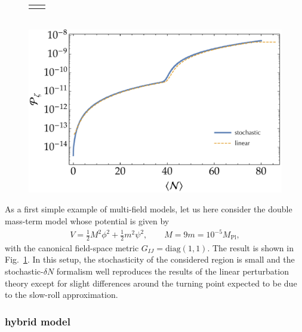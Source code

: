 \documentclass[aps, prd
, preprint
, nofootinbib 
, longbibliography
]{revtex4-1}
\newcommand{\diag}{\mathrm{diag}}
\newcommand{\Mpl}{M_\text{Pl}}
\newcommand{\bae}[1]{\begin{align} #1 \end{align}}
\begin{document}
\begin{figure}
\begin{tabular}{cc}
\begin{minipage}{0.5\hsize}
		\end{minipage}
	\end{tabular} \\[10pt]
	\includegraphics[width=0.5\hsize]{figs/double_chaotic/Pzeta_conf.pdf}
	\caption{}
	\label{figs: double_chaotic_conf}
\end{figure}

As a first simple example of multi-field models, let us here consider the double mass-term model whose potential is given by
\bae{
	V=\frac{1}{2}M^2\phi^2+\frac{1}{2}m^2\psi^2, \qquad M=9m=10^{-5}\Mpl,
}
with the canonical field-space metric $G_{IJ}=\diag(1,1)$. The result is shown in Fig.~\ref{figs: double_chaotic_conf}.
In this setup, the stochasticity of the considered region is small and the stochastic-$\delta N$ formalism well reproduces the results of the linear perturbation theory 
except for slight differences around the turning point expected to be due to the slow-roll approximation.



\subsubsection{hybrid model}
\end{document}
